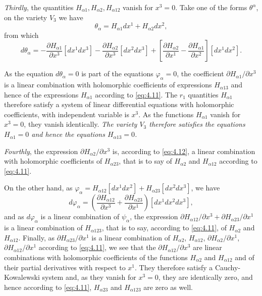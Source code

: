 \documentclass[leqno,11pt]{book}
\numberwithin{equation}{chapter}
\newcommand{\pd}{\partial}
\theoremstyle{shape1}
\theoremstyle{shape0}
\theoremstyle{shape2}
\theoremstyle{definition}
\begin{document}
\emph{Thirdly}, the quantities $H_{\alpha 1}, H_{\alpha 2}, H_{\alpha 12}$ vanish for $x^{3}=0$. Take one of the forms $\theta^{\alpha}$, on the variety $V_{3}$ we have
\[
\theta_{\alpha}=H_{\alpha 1}dx^{1}+H_{\alpha 2}dx^{2},
\]
from which
\begin{equation}
  \label{eq:4.12}
  d\theta_{\alpha}=-\frac{\pd H_{\alpha 1}}{\pd x^{3}}[dx^{1}dx^{3}]-\frac{\pd H_{\alpha 2}}{\pd x^{3}}[dx^{2}dx^{3}]+\left[\frac{\pd H_{\alpha 2}}{\pd x^{1}}-\frac{\pd H_{\alpha 1}}{\pd x^{2}}\right][dx^{1}dx^{2}].
\end{equation}

As the equation $d\theta_{\alpha}=0$ is part of the equations $\varphi_{\alpha}=0$, the coefficient $\pd H_{\alpha 1}/\pd x^{3}$ is a linear combination with holomorphic coefficients of expressions $H_{\alpha 13}$ and hence of the expressions $H_{\alpha 1}$ according to \eqref{eq:4.11}. The $r_{1}$ quantities $H_{\alpha 1}$ therefore satisfy a system of linear differential equations with holomorphic coefficients, with independent variable is $x^{3}$. As the functions $H_{\alpha 1}$ vanish for $x^{3}=0$, they vanish identically. \emph{The variety $V_{3}$ therefore satisfies the equations $H_{\alpha 1}=0$ and hence the equations $H_{\alpha 13}=0$.}

\emph{Fourthly}, the expression $\pd H_{\alpha 2}/\pd x^{3}$ is, according to \eqref{eq:4.12}, a linear combination with holomorphic coefficients of $H_{\alpha 23}$, that is to say of $H_{\alpha 2}$ and $H_{\alpha 12}$ according to \eqref{eq:4.11}.

On the other hand, as $\varphi_{\alpha}=H_{\alpha 12}[dx^{1}dx^{2}]+H_{\alpha 23}[dx^{2}dx^{3}]$, we have
\[
d\varphi_{\alpha}=\left(\frac{\pd H_{\alpha 12}}{\pd x^{3}}+\frac{\pd H_{\alpha 23}}{\pd x^{1}}\right)[dx^{1}dx^{2}dx^{3}],
\]
and as $d\varphi_{\alpha}$ is a linear combination of $\psi_{\alpha}$, the expression $\pd H_{\alpha 12}/\pd x^{3}+\pd H_{\alpha 23}/\pd x^{1}$ is a linear combination of $H_{\alpha 123}$, that is to say, according to \eqref{eq:4.11}, of $H_{\alpha 2}$ and $H_{\alpha 12}$. Finally, as $\pd H_{\alpha 23}/\pd x^{1}$ is a linear combination of $H_{\alpha 2}$, $H_{\alpha 12}$, $\pd H_{\alpha 2}/\pd x^{1}$, $\pd H_{\alpha 12}/\pd x^{1}$ according to \eqref{eq:4.11}, we see that the $\pd H_{\alpha 12}/\pd x^{3}$ are linear combinations with holomorphic coefficients of the functions $H_{\alpha 2}$ and $H_{\alpha 12}$ and of their partial derivatives with respect to $x^{1}$. They therefore satisfy a Cauchy-Kowalewski system and, as they vanish for $x^{3}=0$, they are identically zero, and hence according to \eqref{eq:4.11}, $H_{\alpha 23}$ and $H_{\alpha 123}$ are zero as well.
\end{document}
